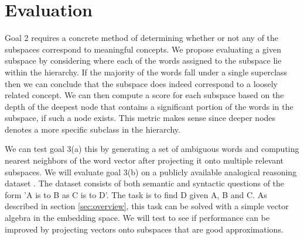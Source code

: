 \section{Evaluation}\label{sec:evaluation}

Goal 2 requires a concrete method of determining whether or not any of the subspaces correspond to meaningful concepts. 
We propose evaluating a given subspace by considering where each of the words assigned to the subspace lie within the hierarchy.
If the majority of the words fall under a single superclass then we can conclude that the subspace does indeed correspond to a loosely related concept. 
We can then compute a score for each subspace based on the depth of the deepest node that contains a significant portion of the words in the subspace, if such a node exists. This metric makes sense since deeper nodes denotes a more specific subclass in the hierarchy. 

We can test goal 3(a) this by generating a set of ambiguous words and computing nearest neighbors of the word vector after projecting it onto multiple relevant subspaces. 
We will evaluate goal 3(b) on a publicly available analogical reasoning dataset \cite{mikolov3}. 
The dataset consists of both semantic and syntactic questions of the form 'A is to B as C is to D'.
The task is to find D given A, B and C. 
As described in section \ref{sec:overview}, this task can be solved with a simple vector algebra in the embedding space.
We will test to see if performance can be improved by projecting vectors onto subspaces that are good approximations. 
